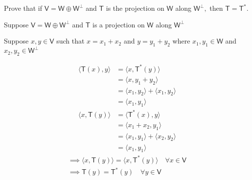 Prove that if $\mathsf{V}=\mathsf{W}\oplus \mathsf{W}^\perp$ and
$\mathsf{T}$ is the projection on $\mathsf{W}$ along
$\mathsf{W}^\perp,$ then $\mathsf{T}=\mathsf{T}^*.$

Suppose $\mathsf{V} = \mathsf{W}\oplus \mathsf{W}^\perp$ and
$\mathsf{T}$ is a projection on $\mathsf{W}$ along $\mathsf{W}^\perp$

Suppose $x,y \in \mathsf{V}$ such that $x=x_1+x_2$ and $y=y_1+y_2$
where $x_1,y_1 \in \mathsf{W}$ and $x_2,y_2 \in \mathsf{W}^\perp$

\begin{align}
\langle \mathsf{T}(x), y \rangle &= \langle x,\mathsf{T}^*(y)\rangle\\
&=\langle x,y_1+y_2\rangle\\
&=\langle x_1,y_2 \rangle + \langle x_1,y_2\rangle\\
&= \langle x_1,y_1 \rangle
\end{align}
\begin{align}
\langle x, \mathsf{T}(y) \rangle &= \langle \mathsf{T}^*(x), y
\rangle\\
&= \langle x_1+x_2,y_1 \rangle\\
&= \langle x_1,y_1 \rangle + \langle x_2,y_2 \rangle \\
&=\langle x_1,y_1 \rangle
\end{align}
\begin{gather}
\implies \langle x, \mathsf{T}(y) \rangle = \langle x, \mathsf{T}^*(y)
\rangle \quad \forall x \in \mathsf{V}\\
\implies \mathsf{T}(y) = \mathsf{T}^*(y) \quad \forall y \in \mathsf{V}
\end{gather}
